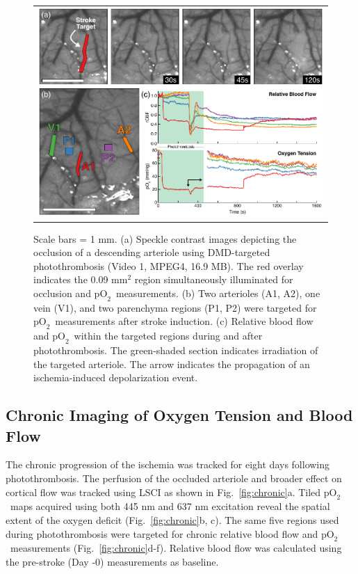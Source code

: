 \documentclass[12pt]{spieman}  %
\newcommand{\pO}{\ensuremath{\text{pO}_2}} 	            %
\begin{document}
\begin{spacing}{2}
\begin{figure}
    \begin{center}
        \begin{tabular}{c}
            \includegraphics[width=6.25in]{Figure5.pdf}
        \end{tabular}
    \end{center}
    \caption {
        \label{fig:photothrombosis}
        Scale bars = 1 mm. (a) Speckle contrast images depicting the occlusion of a descending arteriole using DMD-targeted photothrombosis (Video 1, MPEG4, 16.9 MB). The red overlay indicates the 0.09 mm$^{2}$ region simultaneously illuminated for occlusion and \pO\ measurements. (b) Two arterioles (A1, A2), one vein (V1), and two parenchyma regions (P1, P2) were targeted for \pO\ measurements after stroke induction. (c) Relative blood flow and \pO\ within the targeted regions during and after photothrombosis. The green-shaded section indicates irradiation of the targeted arteriole. The arrow indicates the propagation of an ischemia-induced depolarization event.
    }
\end{figure}


\subsection{Chronic Imaging of Oxygen Tension and Blood Flow}

The chronic progression of the ischemia was tracked for eight days following photothrombosis. The perfusion of the occluded arteriole and broader effect on cortical flow was tracked using LSCI as shown in Fig.~\ref{fig:chronic}a. Tiled \pO\ maps acquired using both 445 nm and 637 nm excitation reveal the spatial extent of the oxygen deficit (Fig.~\ref{fig:chronic}b, c). The same five regions used during photothrombosis were targeted for chronic relative blood flow and \pO\ measurements (Fig.~\ref{fig:chronic}d-f). Relative blood flow was calculated using the pre-stroke (Day -0) measurements as baseline.


\end{spacing}
\end{document}
